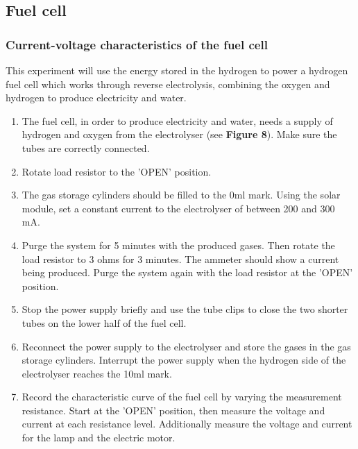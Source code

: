\documentclass{article}
\begin{document}
    \subsection{Fuel cell}
    \subsubsection{Current-voltage characteristics of the fuel cell}
    This experiment will use the energy stored in the hydrogen to power a hydrogen fuel cell which works through reverse 
    electrolysis, combining the oxygen and hydrogen to produce electricity and water.
    \begin{enumerate}
        \item  The fuel cell, in order to produce electricity and water, needs a supply of hydrogen and oxygen from the 
        electrolyser (see \textbf{Figure 8}). Make sure the tubes are correctly connected.
        \item Rotate load resistor to the 'OPEN' position.
        \item The gas storage cylinders should be filled to the 0ml mark. Using the solar module, set a constant current 
        to the electrolyser of between 200 and 300 mA.
        \item Purge the system for 5 minutes with the produced gases. Then rotate the load resistor to 3 ohms for 3 minutes. 
        The ammeter should show a current being produced. Purge the system again with the load resistor at the 'OPEN' position.
        \item Stop the power supply briefly and use the tube clips to close the two shorter tubes on the lower half of the fuel cell.
        \item Reconnect the power supply to the electrolyser and store the gases in the gas storage cylinders. Interrupt the power 
        supply when the hydrogen side of the electrolyser reaches the 10ml mark.
        \item Record the characteristic curve of the fuel cell by varying the measurement resistance. Start at the 'OPEN' position, 
        then measure the voltage and current at each resistance level. Additionally measure the voltage and current for the lamp 
        and the electric motor.
    \end{enumerate}
\end{document}

